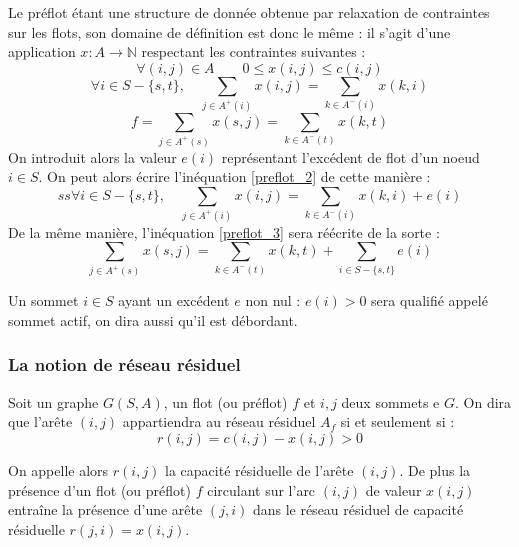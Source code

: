 Le préflot étant une structure de donnée obtenue par relaxation de contraintes sur les flots, son
domaine de définition est donc le même : il s'agit d'une application $x : A \rightarrow \mathbb{N}$
respectant les contraintes suivantes :
		\begin{equation}
			\label{preflot_1}
			\forall (i,j) \in A \qquad 0 \leq x(i,j) \leq c(i,j)
		\end{equation}
		\begin{equation} 
			\label{preflot_2}
			\forall i \in S - \{s,t\},\quad \sum_{j \in A^+(i)} x(i,j) = \sum_{k \in A^-(i)} x(k,i)
		\end{equation}
		\begin{equation}
			\label{preflot_3}
			f = \sum_{j \in A^+(s)} x(s,j) = \sum_{k \in A^-(t)} x(k, t)
		\end{equation}
On introduit alors la valeur $e(i)$ représentant l'excédent de flot d'un noeud $i \in S$. On peut
alors écrire l'inéquation \ref{preflot_2} de cette manière :
\begin{equation}ss
\forall i \in S - \{s,t\},\quad \sum_{j \in A^+(i)} x(i,j) = \sum_{k \in A^-(i)} x(k,i) + e(i)
\end{equation}
De la même manière, l'inéquation \ref{preflot_3} sera réécrite de la sorte :
\begin{equation}
\sum_{j \in A^+(s)} x(s,j) = \sum_{k \in A^-(t)} x(k, t) + \sum_{i \in S-\{s,t\}} e(i)
\end{equation}

Un sommet $i \in S$ ayant un excédent $e$ non nul : $e(i) > 0$ sera qualifié appelé sommet actif, on
dira aussi qu'il est débordant.

\subsubsection{La notion de réseau résiduel}

Soit un graphe $G(S, A)$, un flot (ou préflot) $f$ et $i,j$ deux sommets e $G$. On dira que l'arête
$(i,j)$ appartiendra au réseau résiduel $A_f$ si et seulement si :
\begin{equation}
	 r(i,j) = c(i,j) - x(i,j) > 0
\end{equation}

On appelle alors $r(i,j)$ la capacité résiduelle de l'arête $(i,j)$. De plus la présence d'un flot
(ou préflot) $f$ circulant sur l'arc $(i,j)$ de valeur $x(i,j)$ entraîne la présence d'une arête $(j,i)$
dans le réseau résiduel de capacité résiduelle $r(j,i) = x(i,j)$.

